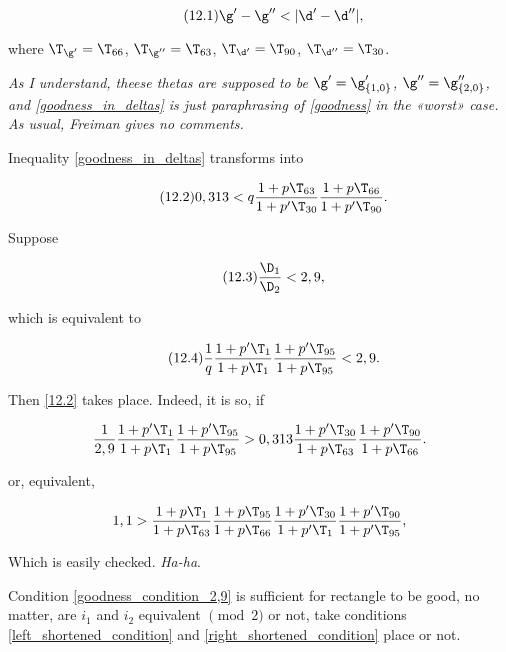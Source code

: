 \begin{equation}\tag{12.1}\label{goodness_in_deltas}
	\g' - \g'' < |\d' - \d''|,
\end{equation}

where
$\T_{\g'} = \T_{66}$,
$\T_{\g''} = \T_{63}$,
$\T_{\d'} = \T_{90}$,
$\T_{\d''} = \T_{30}$.

{
	\itshape
	As I understand, theese thetas are supposed to be
	$\g' = \g_{\{1, 0\}}'$,
	$\g'' = \g_{\{2, 0\}}''$,
	and \ref{goodness_in_deltas} is just paraphrasing of \ref{goodness}
	in the «worst» case.
	As usual, Freiman gives no comments.
}

Inequality \ref{goodness_in_deltas} transforms into

\begin{equation}\tag{12.2}\label{12.2}
	0,313 <
	q
	\dfrac{1 + p \T_{63}}{1 + p' \T_{30}}
	\dfrac{1 + p \T_{66}}{1 + p' \T_{90}}.
\end{equation}

Suppose

\begin{equation}\tag{12.3}\label{goodness_condition_2,9}
	\dfrac{\D_1}{\D_2} < 2,9,
\end{equation}

which is equivalent to

\begin{equation}\tag{12.4}
	\dfrac{1}{q}
	\dfrac{1 + p' \T_{1}}{1 + p \T_{1}}
	\dfrac{1 + p' \T_{95}}{1 + p \T_{95}}
	<
	2,9.
\end{equation}

Then \ref{12.2} takes place. Indeed, it is so, if

\begin{equation*}
	\dfrac{1}{2,9}
	\dfrac{1 + p' \T_{1}}{1 + p \T_{1}}
	\dfrac{1 + p' \T_{95}}{1 + p \T_{95}}
	>
	0,313
	\dfrac{1 + p' \T_{30}}{1 + p \T_{63}}
	\dfrac{1 + p' \T_{90}}{1 + p \T_{66}}.
\end{equation*}

or, equivalent,

\begin{equation*}
	1,1
	>
	\dfrac{1 + p \T_{1}}{1 + p \T_{63}}
	\dfrac{1 + p \T_{95}}{1 + p \T_{66}}
	\dfrac{1 + p' \T_{30}}{1 + p' \T_{1}}
	\dfrac{1 + p' \T_{90}}{1 + p' \T_{95}},
\end{equation*}

Which is easily checked. \textit{Ha-ha}.

Condition \ref{goodness_condition_2,9} is sufficient for rectangle to be good,
no matter, are $i_1$ and $i_2$ equivalent $\pmod 2$ or not, take conditions
\ref{left_shortened_condition} and \ref{right_shortened_condition} place or not.


